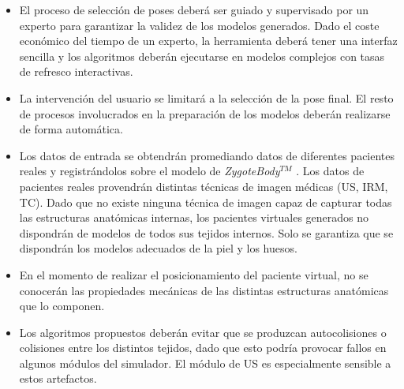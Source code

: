\begin{itemize}
    \item El proceso de selección de poses deberá ser guiado y supervisado por un experto para garantizar la validez de los modelos generados. Dado el coste económico del tiempo de un experto, la herramienta deberá tener una interfaz sencilla y los algoritmos deberán ejecutarse en modelos complejos con tasas de refresco interactivas.
    \item La intervención del usuario se limitará a la selección de la pose final. El resto de procesos involucrados en la preparación de los modelos deberán realizarse de forma automática.
    \item Los datos de entrada se obtendrán promediando datos de diferentes pacientes reales y registrándolos sobre el modelo de \emph{ZygoteBody}$^{TM}$ \cite{kelc2012zygote}. Los datos de pacientes reales provendrán  distintas técnicas de imagen médicas (\ac{US}, \ac{IRM}, \ac{TC}). Dado que no existe ninguna técnica de imagen capaz de capturar todas las estructuras anatómicas internas, los pacientes virtuales generados no dispondrán de modelos de todos sus tejidos internos. Solo se garantiza que se dispondrán los modelos adecuados de la piel y los huesos. 
    \item En el momento de realizar el posicionamiento del paciente virtual, no se conocerán las propiedades mecánicas de las distintas estructuras anatómicas que lo componen.
    \item Los algoritmos propuestos deberán evitar que se produzcan autocolisiones o colisiones entre los distintos tejidos, dado que esto podría provocar fallos en  algunos módulos del simulador. El módulo de \ac{US} es especialmente sensible a estos artefactos.

\end{itemize}

